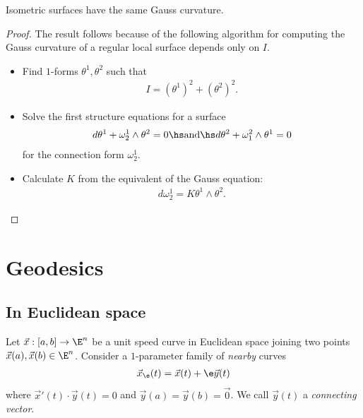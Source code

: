 \documentclass{article}
\begin{document}
\begin{theorem}
    Isometric surfaces have the same Gauss curvature.
\end{theorem}
\begin{proof}
    The result follows because of the following algorithm for computing the Gauss curvature
    of a regular local surface depends only on $I$.
    \begin{itemize}
        \item Find $1$-forms $\theta^1,\theta^2$ such that \begin{align*}
                  I = (\theta^1)^2 + (\theta^2)^2.
              \end{align*}
        \item Solve the first structure equations for a surface \begin{align*}
                  d\theta^1 + \omega_2^1 \wedge \theta^2 = 0\hs\text{and}\hs
                  d\theta^2 + \omega_1^2 \wedge \theta^1 = 0
              \end{align*}
              for the connection form $\omega_2^1$.
        \item Calculate $K$ from the equivalent of the Gauss equation: \begin{align*}
                  d\omega_2^1 = K\theta^1\wedge\theta^2.
              \end{align*}
    \end{itemize}
\end{proof}

\section{Geodesics}

\subsection{In Euclidean space}

\begin{definition}
    Let $\vec x:[a,b]\to\E^n$ be a unit speed curve in Euclidean space joining two points
    $\vec x(a),\vec x(b)\in\E^n$. Consider a $1$-parameter family of \emph{nearby} curves
    \begin{align*}
        \vec x_\e (t) = \vec x(t) + \e\vec y(t)
    \end{align*}
    where $\vec x'(t) \cdot \vec y(t)  = 0$ and $\vec y(a)=\vec y(b)=\vec 0$.
    We call $\vec y(t)$ a \emph{connecting vector}.
\end{definition}
\end{document}
